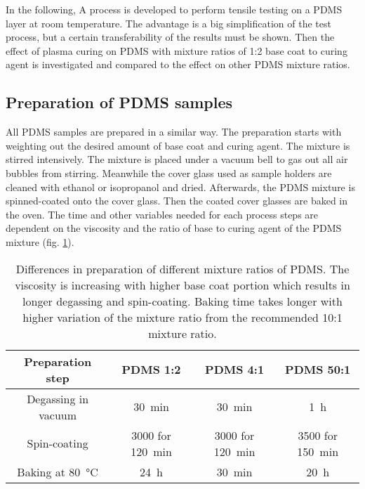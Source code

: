 In the following, A process is developed to perform tensile testing on a PDMS layer at room temperature. The advantage is a big simplification of the test process, but a certain transferability of the results must be shown. Then the effect of plasma curing on PDMS with mixture ratios of 1:2 base coat to curing agent is investigated and compared to the effect on other PDMS mixture ratios.

\subsection{Preparation of PDMS samples}

All PDMS samples are prepared in a similar way. The preparation starts with weighting out the desired amount of base coat and curing agent. The mixture is stirred intensively. The mixture is placed under a vacuum bell to gas out all air bubbles from stirring. Meanwhile the cover glass used as sample holders are cleaned with ethanol or isopropanol and dried. Afterwards, the PDMS mixture is spinned-coated onto the cover glass. Then the coated cover glasses are baked in the oven. The time and other variables needed for each process steps are dependent on the viscosity and the ratio of base to curing agent of the PDMS mixture (fig. \ref{table:preparationPDMSmixturereatios}). 

\begin{table}
	\centering
	\begin{tabular}{|c|c|c|c|}
		\hline
		 Preparation step & PDMS 1:2 & PDMS 4:1 & PDMS 50:1 \\
		\hline
		\hline
		Degassing in vacuum & \SI{30}{\minute} & \SI{30}{\minute} & \SI{1}{\hour}\\
		\hline
		Spin-coating & \SI{3000}{\rpm} for \SI{120}{\minute}  & \SI{3000}{\rpm} for \SI{120}{\minute} & \SI{3500}{\rpm} for \SI{150}{\minute} \\
		\hline
		Baking at \SI{80}{\degreeCelsius} & \SI{24}{\hour} & \SI{30}{\minute} & \SI{20}{\hour}\\
		\hline	
	\end{tabular}
	\caption{Differences in preparation of different mixture ratios of PDMS. The viscosity is increasing with higher base coat portion which results in longer degassing and spin-coating. Baking time takes longer with higher variation of the mixture ratio from the recommended 10:1 mixture ratio.}
	\label{table:preparationPDMSmixturereatios}
\end{table}



